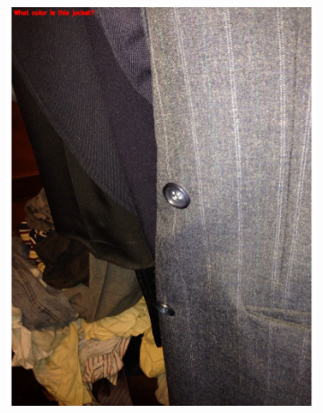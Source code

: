 \documentclass[sigconf]{acmart}
\begin{document}
\begin{figure}[hbp]
\begin{subfigure}[b]{0.3\columnwidth}
                \includegraphics[scale=0.3]{images/color_2.pdf}  
        \end{subfigure}%
        \begin{subfigure}[b]{0.3\columnwidth}

\end{subfigure}
\end{figure}
\end{document}

